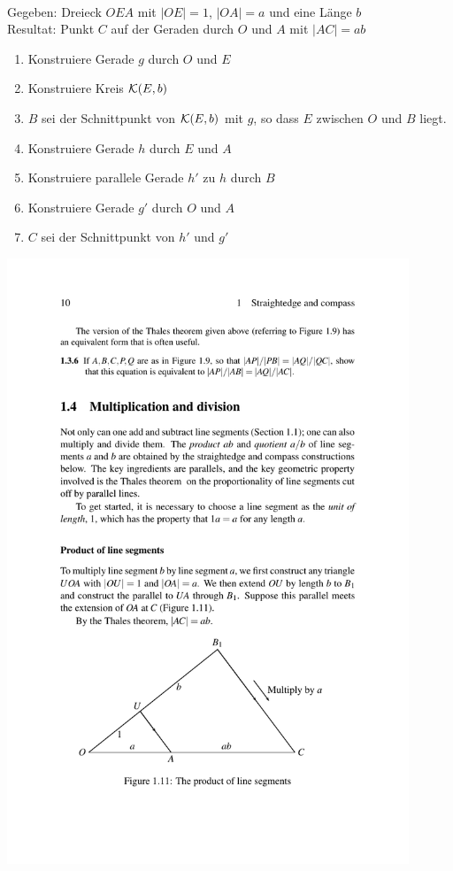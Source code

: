 \begin{konst}\ \\
    Gegeben: Dreieck $OEA$ mit $|OE|=1$, $|OA|=a$ und eine Länge $b$\\
    Resultat: Punkt $C$ auf der Geraden durch $O$ und $A$ mit $|AC|=ab$
    \renewcommand{\labelenumi}{\arabic{enumi}.} %
    \begin{enumerate}
        \item Konstruiere Gerade $g$ durch $O$ und $E$
        \item Konstruiere Kreis ${\mathcal K}(E,b)$
        \item $B$ sei der Schnittpunkt von ${\mathcal K}(E,b)$ mit $g$, so dass $E$ zwischen $O$ und $B$
            liegt.
        \item Konstruiere Gerade $h$ durch $E$ und $A$
        \item Konstruiere parallele Gerade $h'$ zu $h$ durch $B$
        \item Konstruiere Gerade $g'$ durch $O$ und $A$
        \item $C$ sei der Schnittpunkt von $h'$ und $g'$
    \end{enumerate}
\end{konst}

\begin{center}
    \includegraphics[width=12cm]{BILDER/BildProduktVonKanten.pdf}
\end{center}

